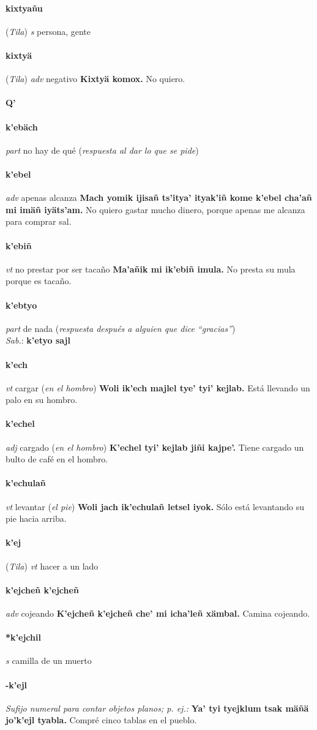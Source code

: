 \documentclass{scrbook}
\newcommand{\entry}[1]{\paragraph{#1}}
\newcommand{\alphaletter}[1]{\addsec{#1}}
\newcommand{\nontranslationdef}[1]{\textit{#1}}
\newcommand{\partofspeech}[1]{\textit{#1}}
\newcommand{\spanishtranslation}[1]{#1}
\newcommand{\clarification}[1]{(\textit{#1})}
\newcommand{\cholexample}[1]{\textbf{#1}}
\newcommand{\exampletranslation}[1]{#1}
\newcommand{\dialectvariant}[1]{\\\textit{#1}:}
\newcommand{\dialectword}[1]{\textbf{#1}}
\newcommand{\relevantdialect}[1]{(\textit{#1})}
\begin{document}
\begin{multicols}{2}
\entry{kixtyañu}
\relevantdialect{Tila}
\partofspeech{s}
\spanishtranslation{persona, gente}

\entry{kixtyä}
\relevantdialect{Tila}
\partofspeech{adv}
\spanishtranslation{negativo}
\cholexample{Kixtyä komox.}
\exampletranslation{No quiero.}

\entry{Q'}
\alphaletter{Q'}

\entry{k'ebäch}
\partofspeech{part}
\spanishtranslation{no hay de qué}
\clarification{respuesta al dar lo que se pide}

\entry{k'ebel}
\partofspeech{adv}
\spanishtranslation{apenas alcanza}
\cholexample{Mach yomik ijisañ ts'itya' ityak'iñ kome k'ebel cha'añ mi imäñ iyäts'am.}
\exampletranslation{No quiero gastar mucho dinero, porque apenas me alcanza para comprar sal.}

\entry{k'ebiñ}
\partofspeech{vt}
\spanishtranslation{no prestar por ser tacaño}
\cholexample{Ma'añik mi ik'ebiñ imula.}
\exampletranslation{No presta su mula porque es tacaño.}

\entry{k'ebtyo}
\partofspeech{part}
\spanishtranslation{de nada}
\clarification{respuesta después a alguien que dice “gracias”}
\dialectvariant{Sab.}
\dialectword{k'etyo sajl}

\entry{k'ech}
\partofspeech{vt}
\spanishtranslation{cargar}
\clarification{en el hombro}
\cholexample{Woli ik'ech majlel tye' tyi' kejlab.}
\exampletranslation{Está llevando un palo en su hombro.}

\entry{k'echel}
\partofspeech{adj}
\spanishtranslation{cargado}
\clarification{en el hombro}
\cholexample{K'echel tyi' kejlab jiñi kajpe'.}
\exampletranslation{Tiene cargado un bulto de café en el hombro.}

\entry{k'echulañ}
\partofspeech{vt}
\spanishtranslation{levantar}
\clarification{el pie}
\cholexample{Woli jach ik'echulañ letsel iyok.}
\exampletranslation{Sólo está levantando su pie hacia arriba.}

\entry{k'ej}
\relevantdialect{Tila}
\partofspeech{vt}
\spanishtranslation{hacer a un lado}

\entry{k'ejcheñ k'ejcheñ}
\partofspeech{adv}
\spanishtranslation{cojeando}
\cholexample{K'ejcheñ k'ejcheñ che' mi icha'leñ xämbal.}
\exampletranslation{Camina cojeando.}

\entry{*k'ejchil}
\partofspeech{s}
\spanishtranslation{camilla de un muerto}

\entry{-k'ejl}
\nontranslationdef{Sufijo numeral para contar objetos planos; p. ej.:}
\cholexample{Ya' tyi tyejklum tsak mäñä jo'k'ejl tyabla.}
\exampletranslation{Compré cinco tablas en el pueblo.}


\end{multicols}
\end{document}
